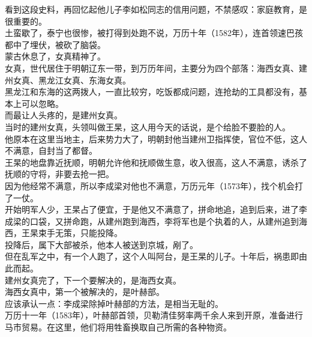 \begin{multicols}{\theparacolNo}
看到这段史料，再回忆起他儿子李如松同志的信用问题，不禁感叹：家庭教育，是很重要的。\\

土蛮歇了，泰宁也很惨，被打得到处跑不说，万历十年（1582年），连首领速巴孩都中了埋伏，被砍了脑袋。\\

蒙古休息了，女真精神了。\\

女真，世代居住于明朝辽东一带，到万历年间，主要分为四个部落：海西女真、建州女真、黑龙江女真、东海女真。\\

黑龙江和东海的这两拨人，一直比较穷，吃饭都成问题，连抢劫的工具都没有，基本上可以忽略。\\

而最让人头疼的，是建州女真。\\

当时的建州女真，头领叫做王杲，这人用今天的话说，是个给脸不要脸的人。\\

他原本在这里当地主，后来势力大了，明朝封他当建州卫指挥使，官位不低，这人不满意，自封当了都督。\\

王杲的地盘靠近抚顺，明朝允许他和抚顺做生意，收入很高，这人不满意，诱杀了抚顺的守将，非要去抢一把。\\

因为他经常不满意，所以李成梁对他也不满意，万历元年（1573年），找个机会打了一仗。\\

开始明军人少，王杲占了便宜，于是他又不满意了，拼命地追，追到后来，进了李成梁的口袋，又拼命跑，从建州跑到海西，李将军也是个执着的人，从建州追到海西，王杲束手无策，只能投降。\\

投降后，属下大部被杀，他本人被送到京城，剐了。\\

但在乱军之中，有一个人跑了，这个人叫阿台，是王杲的儿子。十年后，祸患即由此而起。\\

建州女真完了，下一个要解决的，是海西女真。\\

海西女真中，第一个被解决的，是叶赫部。\\

应该承认一点：李成梁除掉叶赫部的方法，是相当无耻的。\\

万历十一年（1583年），叶赫部首领，贝勒清佳努率两千余人来到开原，准备进行马市贸易。在这里，他们将用牲畜换取自己所需的各种物资。\\


\end{multicols}
